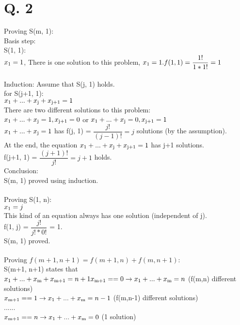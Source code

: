 \documentclass[10pt]{article}
\begin{document}
\section*{Q. 2}
Proving S(m, 1):\\Basis step:\\S(1, 1):\\$x\textsubscript{1}=1$, There is one solution to this problem, $x\textsubscript{1}=1.\\f(1, 1) = \dfrac{1!}{1*1!} = 1$\\\\
Induction: Assume that S(j, 1) holds.\\ for S(j+1, 1):\\
$x\textsubscript{1}+...+x\textsubscript{j}+x\textsubscript{j+1} = 1$\\
There are two different solutions to this problem:\\ $x\textsubscript{1}+...+x\textsubscript{j}=1, x\textsubscript{j+1}=0$ or $x\textsubscript{1}+...+x\textsubscript{j}=0, x\textsubscript{j+1}=1$\\ $x\textsubscript{1}+...+x\textsubscript{j}=1$ has f(j, 1) = $\dfrac{j!}{(j-1)!} = j$ solutions (by the assumption).\\ At the end, the equation $x\textsubscript{1}+...+x\textsubscript{j}+x\textsubscript{j+1} = 1$ has j+1 solutions.\\ f(j+1, 1) = $\dfrac{(j+1)!}{j!} = j+1$ holds.\\
Conclusion:\\
S(m, 1) proved using induction.\\\\Proving S(1, n):\\$x\textsubscript{1}=j$\\This kind of an equation always has one solution (independent of j).\\ f(1, j) = $\dfrac{j!}{j!*0!}$ = 1.
\\ S(m, 1) proved.\\\\
Proving $f(m+1,n+1)=f(m+1,n)+f(m,n+1)$:\\
S(m+1, n+1) states that $x\textsubscript{1}+...+x\textsubscript{m}+x\textsubscript{m+1}=n+1\\\\
x\textsubscript{m+1}==0 \rightarrow x\textsubscript{1}+...+x\textsubscript{m}=n$ (f(m,n) different solutions)\\$x\textsubscript{m+1}==1 \rightarrow x\textsubscript{1}+...+x\textsubscript{m}=n-1$ (f(m,n-1) different solutions)\\......\\$x\textsubscript{m+1}==n \rightarrow x\textsubscript{1}+...+x\textsubscript{m}=0$ (1 solution)\\\\
\end{document}
